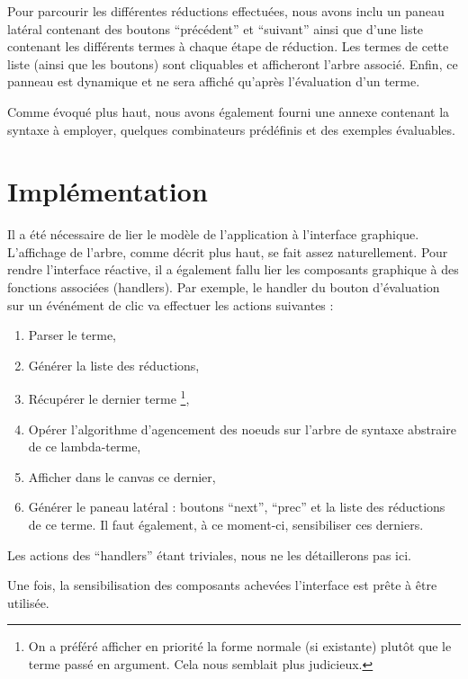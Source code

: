 \documentclass[a4paper, 11pt]{report}
\begin{document}
Pour parcourir les différentes réductions effectuées, nous avons inclu
un paneau latéral contenant des boutons ``précédent'' et ``suivant''
ainsi que d'une liste contenant les différents termes à chaque étape
de réduction. Les termes de cette liste (ainsi que les boutons) sont
cliquables et afficheront l'arbre associé. Enfin, ce panneau est
dynamique et ne sera affiché qu'après l'évaluation d'un terme.

Comme évoqué plus haut, nous avons également fourni une annexe
contenant la syntaxe à employer, quelques combinateurs prédéfinis
et des exemples évaluables.

\section{Implémentation}

Il a été nécessaire de lier le modèle de l'application à l'interface
graphique. L'affichage de l'arbre, comme décrit plus haut, se fait
assez naturellement. Pour rendre l'interface réactive, il a également
fallu lier les composants graphique à des fonctions associées
(handlers). Par exemple, le handler du bouton d'évaluation sur un
événément de clic va effectuer les actions suivantes :
\begin{enumerate}
\item Parser le terme,
\item Générer la liste des réductions,
\item Récupérer le dernier terme \footnote{On a préféré afficher en
  priorité la forme normale (si existante) plutôt que le terme passé
  en argument. Cela nous semblait plus judicieux.},
\item Opérer l'algorithme d'agencement des noeuds sur l'arbre de
  syntaxe abstraire de ce lambda-terme,
\item Afficher dans le canvas ce dernier,
\item Générer le paneau latéral : boutons ``next'', ``prec'' et la
  liste des réductions de ce terme. Il faut également, à ce moment-ci,
  sensibiliser ces derniers.
\end{enumerate}
Les actions des ``handlers'' étant triviales, nous ne les détaillerons
pas ici.

Une fois, la sensibilisation des composants achevées l'interface est
prête à être utilisée.
\end{document}

